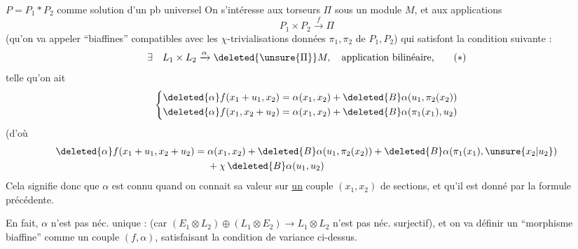 $P=P_1*P_2$  comme solution d'un pb universel
On s'intéresse aux torseurs $\Pi$ sous un module $M$, et aux applications
\[
P_1\times P_2\xrightarrow{f}\Pi
\]
(qu'on va appeler ``biaffines'' compatibles avec les $\chi$-trivialisations données $\pi_1,\pi_2$ de $P_1,P_2$) qui satisfont la condition suivante :
\[
\exists\quad L_1\times L_2\xrightarrow{\alpha}\deleted{\unsure{\Pi}}M,\quad\text{application bilinéaire,}\tag*{$(*)$}
\]
telle qu'on ait
\[
\left\{\begin{aligned}
\deleted{\alpha}f(x_1+u_1,x_2)&=\alpha(x_1,x_2)+\deleted{B}\alpha(u_1,\pi_2(x_2))\\
\deleted{\alpha}f(x_1,x_2+u_2)&=\alpha(x_1,x_2)+\deleted{B}\alpha(\pi_1(x_1),u_2)
\end{aligned}\right.
\]
(d'où
\[
\begin{aligned}
\deleted{\alpha}f(x_1+u_1,x_2+u_2)={}&\alpha(x_1,x_2)+\deleted{B}\alpha(u_1,\pi_2(x_2))+
\deleted{B}\alpha(\pi_1(x_1),\unsure{x_2|u_2})\\
&+\chi\,\deleted{B}\alpha(u_1,u_2)
\end{aligned}
\]
Cela signifie donc que $\alpha$ est connu  quand on connait sa valeur sur \uline{un} couple $(x_1,x_2)$ de sections, et qu'il est donné par la formule précédente.

 En fait, $\alpha$ n'est pas néc. unique :
(car $(E_1\otimes L_2)\oplus(L_1\otimes E_2)\longrightarrow L_1\otimes L_2$ n'est pas néc. surjectif), et on va définir un  ``morphisme biaffine'' comme un couple $(f,\alpha)$, satisfaisant la condition de variance ci-dessus.
